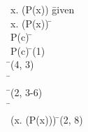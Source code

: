 \documentclass{article}
\begin{document}
\begin{proofbox}
\: \forall x. (\lnot P(x)) \= \hbox{given} \\
\open
\: \exists x. (P(x)) \= \asm \\
\open
\: P(c) \= \asm \\
\: \lnot P(c) \= \forallelim(1) \\
\: \bot \= \notelim(4, 3) \\
\: \bot \=  \\
\close
\: \bot \= \existselim(2, 3-6) \\
\: \bot \=  \\
\close
\: \lnot (\exists x. (P(x))) \= \notintro(2, 8) \\
\end{proofbox}
\end{document}
